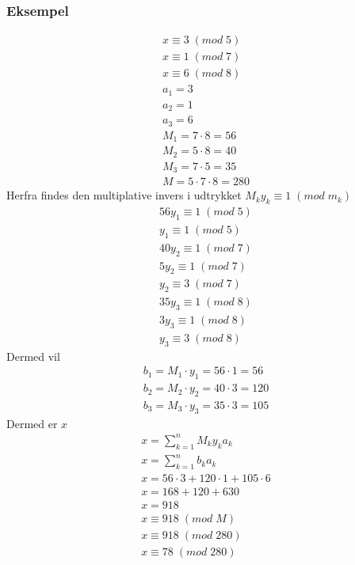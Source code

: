 \documentclass[12pt, a4paper]{article}
\begin{document}
			\subsubsection{Eksempel}
				\begin{align*}
					x\equiv 3\;(mod\;5)\\
					x\equiv 1\;(mod\;7)\\
					x\equiv 6\;(mod\;8)\\[4mm]
					a_1 = 3\\
					a_2 = 1\\
					a_3 = 6\\
					M_1 = 7\cdot 8 = 56\\
					M_2 = 5\cdot 8 = 40\\
					M_3 = 7\cdot 5 = 35\\
					M = 5\cdot 7\cdot 8 = 280
				\end{align*}
				Herfra findes den multiplative invers i udtrykket $M_ky_k\equiv 1\;(mod\;m_k)$
				\begin{align*}
					56y_1\equiv 1\;(mod\;5)\\
					y_1\equiv 1\;(mod\;5)\\
					40y_2\equiv 1\;(mod\;7)\\
					5y_2\equiv 1\;(mod\;7)\\
					y_2\equiv 3\;(mod\;7)\\
					35y_3\equiv 1\;(mod\;8)\\
					3y_3\equiv 1\;(mod\;8)\\
					y_3\equiv 3\;(mod\;8)
				\end{align*}
				Dermed vil
				\begin{align*}
					b_1=M_1\cdot y_1 = 56\cdot 1 = 56\\
					b_2=M_2\cdot y_2 = 40 \cdot 3 = 120\\
					b_3=M_3\cdot y_3 = 35\cdot 3 = 105
				\end{align*}
				Dermed er $x$
				\begin{align*}
					x=\sum\limits_{k=1}^nM_ky_ka_k\\
					x=\sum\limits_{k=1}^nb_ka_k\\
					x=56\cdot 3 + 120 \cdot 1 + 105 \cdot 6\\
					x = 168 + 120 + 630\\
					x = 918\\
					x \equiv 918\;(mod\;M)\\
					x \equiv 918 \;(mod\;280)\\
					x \equiv 78\;(mod\;280)
				\end{align*}
\end{document}
